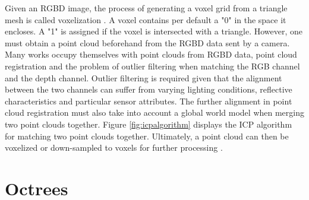 Given an RGBD image, the process of generating a voxel grid from a triangle mesh is called voxelization \cite{open3D2021voxelization}. A voxel contains per default a "0" in the space it encloses. A "1" is assigned if the voxel is intersected with a triangle. However, one must obtain a point cloud beforehand from the RGBD data sent by a camera. Many works \cite{jia2019new, huang2021comprehensive} occupy themselves with point clouds from RGBD data, point cloud registration and the problem of outlier filtering when matching the RGB channel and the depth channel. Outlier filtering is required given that the alignment between the two channels can suffer from varying lighting conditions, reflective characteristics and particular sensor attributes. The further alignment in point cloud registration must also take into account a global world model when merging two point clouds together. Figure \ref{fig:icpalgorithm} displays the ICP algorithm \cite{open3D2021icp} for matching two point clouds together. Ultimately, a point cloud can then be voxelized or down-sampled to voxels for further processing \cite{open3D2021pointcloud}.













\section{Octrees}\label{chap2:octrees}


